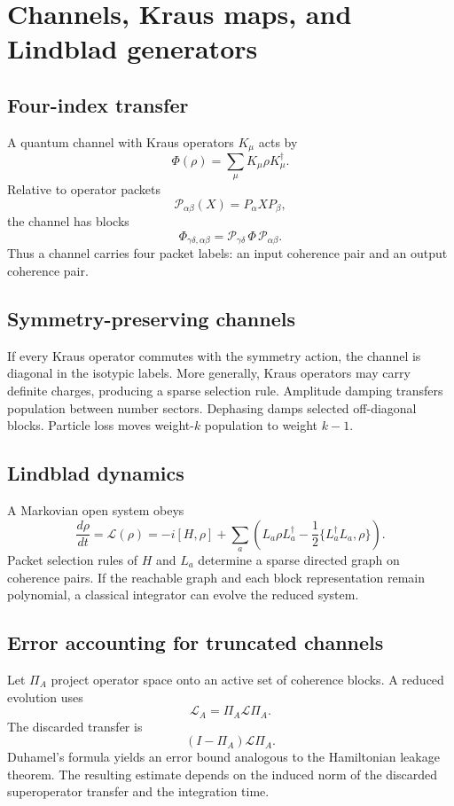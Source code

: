 \chapter{Channels, Kraus maps, and Lindblad generators}
\label{ch:channels}

\section{Four-index transfer}
A quantum channel with Kraus operators $K_\mu$ acts by
\[
\Phi(\rho)
=
\sum_\mu K_\mu\rho K_\mu^\dagger.
\]
Relative to operator packets
\[
\mathcal P_{\alpha\beta}(X)
=
P_\alpha X P_\beta,
\]
the channel has blocks
\[
\Phi_{\gamma\delta,\alpha\beta}
=
\mathcal P_{\gamma\delta}
\,\Phi\,
\mathcal P_{\alpha\beta}.
\]
Thus a channel carries four packet labels: an input coherence pair and an output coherence pair.

\section{Symmetry-preserving channels}
If every Kraus operator commutes with the symmetry action, the channel is diagonal in the isotypic labels. More generally, Kraus operators may carry definite charges, producing a sparse selection rule. Amplitude damping transfers population between number sectors. Dephasing damps selected off-diagonal blocks. Particle loss moves weight-$k$ population to weight $k-1$.

\section{Lindblad dynamics}
A Markovian open system obeys
\[
\frac{d\rho}{dt}
=
\mathcal L(\rho)
=
-i[H,\rho]
+
\sum_a
\left(
L_a\rho L_a^\dagger
-
\frac12\{L_a^\dagger L_a,\rho\}
\right).
\]
Packet selection rules of $H$ and $L_a$ determine a sparse directed graph on coherence pairs. If the reachable graph and each block representation remain polynomial, a classical integrator can evolve the reduced system.

\section{Error accounting for truncated channels}
Let $\Pi_A$ project operator space onto an active set of coherence blocks. A reduced evolution uses
\[
\mathcal L_A
=
\Pi_A\mathcal L\Pi_A.
\]
The discarded transfer is
\[
(I-\Pi_A)\mathcal L\Pi_A.
\]
Duhamel's formula yields an error bound analogous to the Hamiltonian leakage theorem. The resulting estimate depends on the induced norm of the discarded superoperator transfer and the integration time.

